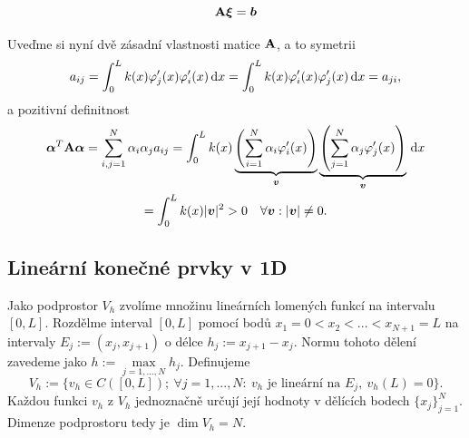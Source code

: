 \begin{equation}
  \mathbf{A} \mathbf{\boldsymbol{\xi}} = \mathbf{\boldsymbol{b}}\label{eqn:linear_system}
\end{equation}

Uveďme si nyní dvě zásadní vlastnosti matice $\mathbf{A}$, a to symetrii
\begin{equation}
  a_{ij} = \int_0^L k(x) \varphi'_j(x) \varphi_i'(x) \,{\rm d} x = \int_0^L k(x) \varphi'_i(x) \varphi_j'(x) \,{\rm d} x = a_{ji}, \label{eqn:linear_system_symetry}
\end{equation}
a pozitivní definitnost
\begin{multline}
  \mathbf{\boldsymbol{\alpha}}^T \mathbf{A} \mathbf{\boldsymbol{\alpha}} = \sum\limits_{i,j=1}^N \alpha_i \alpha_j a_{ij}
  = \int_0^L k(x)
    \underbrace{\left( \sum\limits_{i=1}^N \alpha_i \varphi'_i(x) \right)}_{\mathbf{\boldsymbol{v}}}
    \underbrace{\left( \sum\limits_{j=1}^N \alpha_j \varphi'_j(x) \right)}_{\mathbf{\boldsymbol{v}}} \,{\rm d} x \\
  = \int_0^L k(x) |\mathbf{\boldsymbol{v}}|^2 > 0 \quad \forall \mathbf{\boldsymbol{v}}: |\mathbf{\boldsymbol{v}}|\neq 0. \label{eqn:linear_system_pos_def}
\end{multline}
    
    

\subsection{Lineární konečné prvky v 1D}
Jako podprostor $V_h$ zvolíme množinu lineárních lomených funkcí na intervalu $[0,L]$.
Rozdělme interval $[0,L]$ pomocí bodů $x_1=0<x_2<...<x_{N+1}=L$ na intervaly $E_j:=(x_j,x_{j+1})$ o délce $h_j:=x_{j+1}-x_{j}$.
Normu tohoto dělení zavedeme jako $h:=\max\limits_{j=1,...,N} h_j$.
Definujeme
\[ V_h:=\{v_h\in C([0,L]);~\forall j=1,...,N:~v_h \mbox{ je lineární na }E_j,~v_h(L)=0 \}. \]
Každou funkci $v_h$ z $V_h$ jednoznačně určují její hodnoty v dělících bodech $\{x_j\}_{j=1}^N$.
Dimenze podprostoru tedy je $\dim V_h=N$.

